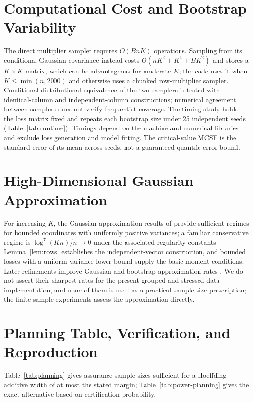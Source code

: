 \documentclass[twoside,11pt]{article}
\begin{document}
\section{Computational Cost and Bootstrap Variability}
\label{app:runtime}
The direct multiplier sampler requires $O(BnK)$ operations. Sampling from its conditional
Gaussian covariance instead costs $O(nK^2+K^3+BK^2)$ and stores a $K\times K$ matrix, which can
be advantageous for moderate $K$; the code uses it when $K\leq\min(n,2000)$ and otherwise uses
a chunked row-multiplier sampler. Conditional distributional equivalence of the two samplers is
tested with identical-column and independent-column constructions; numerical agreement between
samplers does not verify frequentist coverage. The timing study holds the loss matrix fixed and
repeats each bootstrap size under 25 independent seeds (Table~\ref{tab:runtime}). Timings depend
on the machine and numerical libraries and exclude loss generation and model fitting. The
critical-value MCSE is the standard error of its mean across seeds, not a guaranteed quantile
error bound.
\begin{table}[ht]
\centering\small
\caption{Conditional-covariance multiplier timing and variability.}
\label{tab:runtime}
\end{table}

\section{High-Dimensional Gaussian Approximation}
\label{app:highdim}
For increasing $K$, the Gaussian-approximation results of \citet{chernozhukov2013gaussian}
provide sufficient regimes for bounded coordinates with uniformly positive variances; a familiar
conservative regime is $\log^7(Kn)/n\to0$ under the associated regularity constants.
Lemma~\ref{lem:rows} establishes the independent-vector construction, and bounded losses with a
uniform variance lower bound supply the basic moment conditions. Later refinements improve
Gaussian and bootstrap approximation rates \citep{cckk2022}. We do not assert their sharpest
rates for the present grouped and stressed-data implementation, and none of them is used as a
practical sample-size prescription; the finite-sample experiments assess the approximation
directly.

\section{Planning Table, Verification, and Reproduction}
\label{app:verification}
Table~\ref{tab:planning} gives assurance sample sizes sufficient for a Hoeffding additive width
of at most the stated margin; Table~\ref{tab:power-planning} gives the exact alternative based on
certification probability.
\begin{table}[ht]
\centering\small
\caption{Conservative assurance-sample planning for a Hoeffding additive width at most the
stated margin, with $\alpha=.05$. This is not a guarantee of a particular recall.}
\label{tab:planning}
\end{table}
\end{document}
